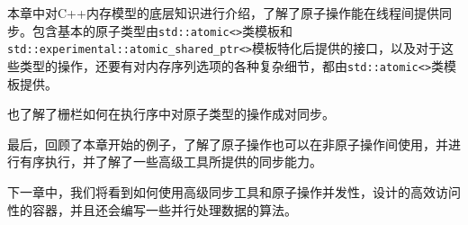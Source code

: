 
本章中对C++内存模型的底层知识进行介绍，了解了原子操作能在线程间提供同步。包含基本的原子类型由\texttt{std::atomic<>}类模板和\texttt{std::experimental::atomic\_shared\_ptr<>}模板特化后提供的接口，以及对于这些类型的操作，还要有对内存序列选项的各种复杂细节，都由\texttt{std::atomic<>}类模板提供。

也了解了栅栏如何在执行序中对原子类型的操作成对同步。

最后，回顾了本章开始的例子，了解了原子操作也可以在非原子操作间使用，并进行有序执行，并了解了一些高级工具所提供的同步能力。

下一章中，我们将看到如何使用高级同步工具和原子操作并发性，设计的高效访问性的容器，并且还会编写一些并行处理数据的算法。